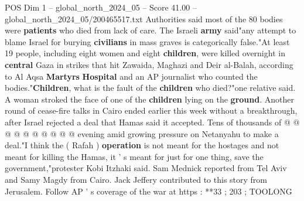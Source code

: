 \begin{textsample}{POS Dim 1 – global\_north\_2024\_05 – Score 41.00 – global\_north\_2024\_05/200465517.txt}
Authorities said most of the 80 bodies were \textbf{patients} who died from lack of care.
The Israeli \textbf{army} said"any attempt to blame Israel for burying \textbf{civilians} in mass graves is categorically false."At least 19 people, including eight women and eight \textbf{children}, were killed overnight in \textbf{central} Gaza in strikes that hit Zawaida, Maghazi and Deir al-Balah, according to Al Aqsa \textbf{Martyrs} \textbf{Hospital} and an AP journalist who counted the bodies."\textbf{Children}, what is the fault of the \textbf{children} who died?"one relative said.
A woman stroked the face of one of the \textbf{children} lying on the \textbf{ground}.
Another round of cease-fire talks in Cairo ended earlier this week without a breakthrough, after Israel rejected a deal that Hamas said it accepted.
Tens of thousands of @ @ @ @ @ @ @ @ @ @ evening amid growing pressure on Netanyahu to make a deal."I think the ( Rafah ) \textbf{operation} is not meant for the hostages and not meant for killing the Hamas, it ' s meant for just for one thing, save the government,"protester Kobi Itzhaki said.
Sam Mednick reported from Tel Aviv and Samy Magdy from Cairo.
Jack Jeffery contributed to this story from Jerusalem.
Follow AP ' s coverage of the war at https : **33 ; 203 ; TOOLONG

\end{textsample}
